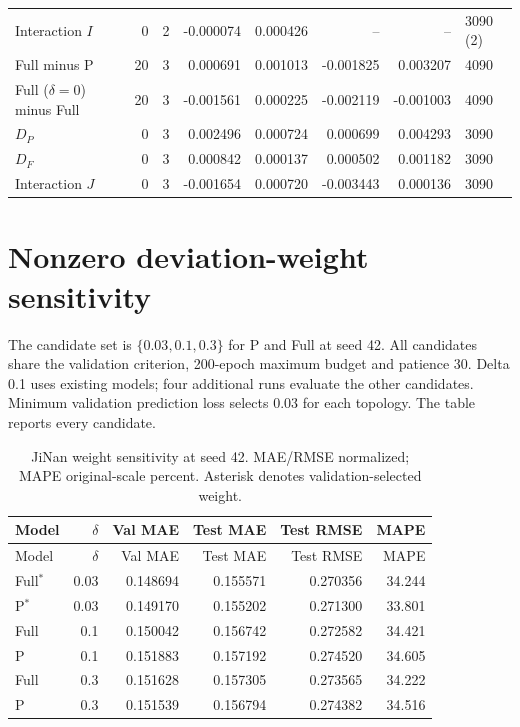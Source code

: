 \documentclass[a4paper,10pt]{article}
\begin{document}
\begin{longtable}{p{42mm}rrrrrrl}
Interaction $I$ & 0 & 2 & -0.000074 & 0.000426 & -- & -- & 3090 (2) \\

Full minus P & 20 & 3 & 0.000691 & 0.001013 & -0.001825 & 0.003207 & 4090 \\

Full ($\delta=0$) minus Full & 20 & 3 & -0.001561 & 0.000225 & -0.002119 & -0.001003 & 4090 \\

$D_P$ & 0 & 3 & 0.002496 & 0.000724 & 0.000699 & 0.004293 & 3090 \\

$D_F$ & 0 & 3 & 0.000842 & 0.000137 & 0.000502 & 0.001182 & 3090 \\

Interaction $J$ & 0 & 3 & -0.001654 & 0.000720 & -0.003443 & 0.000136 & 3090 \\

\bottomrule
\end{longtable}\endgroup

\section{Nonzero deviation-weight sensitivity}
The candidate set is $\{0.03,0.1,0.3\}$ for P and Full at seed 42. All candidates share the validation criterion, 200-epoch maximum budget and patience 30. Delta 0.1 uses existing models; four additional runs evaluate the other candidates. Minimum validation prediction loss selects 0.03 for each topology. The table reports every candidate.

\begingroup\footnotesize\setlength{\tabcolsep}{4pt}
\begin{longtable}{lrrrrr}
\caption{JiNan weight sensitivity at seed 42. MAE/RMSE normalized; MAPE original-scale percent. Asterisk denotes validation-selected weight.}\\
\toprule
Model & $\delta$ & Val MAE & Test MAE & Test RMSE & MAPE \\
\midrule\endfirsthead
\toprule
Model & $\delta$ & Val MAE & Test MAE & Test RMSE & MAPE \\
\midrule\endhead

Full$^*$ & 0.03 & 0.148694 & 0.155571 & 0.270356 & 34.244 \\

P$^*$ & 0.03 & 0.149170 & 0.155202 & 0.271300 & 33.801 \\

Full & 0.1 & 0.150042 & 0.156742 & 0.272582 & 34.421 \\

P & 0.1 & 0.151883 & 0.157192 & 0.274520 & 34.605 \\

Full & 0.3 & 0.151628 & 0.157305 & 0.273565 & 34.222 \\

P & 0.3 & 0.151539 & 0.156794 & 0.274382 & 34.516 \\

\bottomrule
\end{longtable}\endgroup
\end{document}
